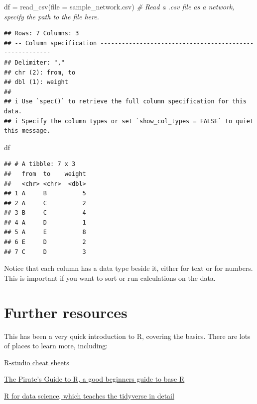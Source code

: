 \documentclass[
]{book}
\newenvironment{Shaded}{\begin{snugshade}}{\end{snugshade}}
\newcommand{\AttributeTok}[1]{\textcolor[rgb]{0.77,0.63,0.00}{#1}}
\newcommand{\CommentTok}[1]{\textcolor[rgb]{0.56,0.35,0.01}{\textit{#1}}}
\newcommand{\FunctionTok}[1]{\textcolor[rgb]{0.00,0.00,0.00}{#1}}
\newcommand{\NormalTok}[1]{#1}
\newcommand{\OtherTok}[1]{\textcolor[rgb]{0.56,0.35,0.01}{#1}}
\newcommand{\StringTok}[1]{\textcolor[rgb]{0.31,0.60,0.02}{#1}}
\begin{document}
\begin{Shaded}
\begin{Highlighting}[]
\NormalTok{df }\OtherTok{=} \FunctionTok{read\_csv}\NormalTok{(}\AttributeTok{file =} \StringTok{\textquotesingle{}sample\_network.csv\textquotesingle{}}\NormalTok{) }\CommentTok{\# Read a .csv file as a network, specify the path to the file here.}
\end{Highlighting}
\end{Shaded}

\begin{verbatim}
## Rows: 7 Columns: 3
## -- Column specification --------------------------------------------------------
## Delimiter: ","
## chr (2): from, to
## dbl (1): weight
## 
## i Use `spec()` to retrieve the full column specification for this data.
## i Specify the column types or set `show_col_types = FALSE` to quiet this message.
\end{verbatim}

\begin{Shaded}
\begin{Highlighting}[]
\NormalTok{df}
\end{Highlighting}
\end{Shaded}

\begin{verbatim}
## # A tibble: 7 x 3
##   from  to    weight
##   <chr> <chr>  <dbl>
## 1 A     B          5
## 2 A     C          2
## 3 B     C          4
## 4 A     D          1
## 5 A     E          8
## 6 E     D          2
## 7 C     D          3
\end{verbatim}

Notice that each column has a data type beside it, either for text or for numbers. This is important if you want to sort or run calculations on the data.

\hypertarget{further-resources}{%
\section{Further resources}\label{further-resources}}

This has been a very quick introduction to R, covering the basics. There are lots of places to learn more, including:

\href{https://www.rstudio.com/resources/cheatsheets/}{R-studio cheat sheets}

\href{https://bookdown.org/ndphillips/YaRrr/}{The Pirate's Guide to R, a good beginners guide to base R}

\href{https://r4ds.had.co.nz}{R for data science, which teaches the tidyverse in detail}
\end{document}
